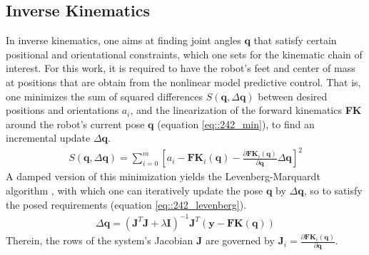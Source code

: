 \subsection{Inverse Kinematics}
\label{sec::242_ik}
In inverse kinematics, one aims at finding joint angles $\bm{q}$ that satisfy certain positional and orientational constraints, which one sets for the kinematic chain of interest. For this work, it is required to have the robot's feet and center of mass at positions that are obtain from the nonlinear model predictive control. That is, one minimizes the sum of squared differences $S(\bm{q},\Delta\bm{q})$ between desired positions and orientations $a_i$, and the linearization of the forward kinematics \textbf{FK} around the robot's current pose $\bm{q}$ (equation \ref{eq::242_min}), to find an incremental update $\Delta\bm{q}$. 
\begin{align}
	S(\bm{q},\Delta\bm{q}) = \sum_{i=0}^m\left[a_i-\textbf{FK}_i(\bm{q})-\frac{\partial\textbf{FK}_i(\bm{q})}{\partial\bm{q}}\Delta\bm{q}\right]^2
	\label{eq::242_min}
\end{align}
A damped version of this minimization yields the Levenberg-Marquardt algorithm \cite{more1978levenberg}\cite{sugihara2011solvability}, with which one can iteratively update the pose $\bm{q}$ by $\Delta\bm{q}$, so to satisfy the posed requirements (equation \ref{eq::242_levenberg}).
\begin{align}
	\Delta\bm{q} = (\bm{J}^T\bm{J}+\lambda\bm{I})^{-1}\bm{J}^T(\bm{y}-\textbf{FK}(\bm{q}))
	\label{eq::242_levenberg}
\end{align}
Therein, the rows of the system's Jacobian $\bm{J}$ are governed by $\bm{J}_i=\frac{\partial\textbf{FK}_i(\bm{q})}{\partial\bm{q}}$.